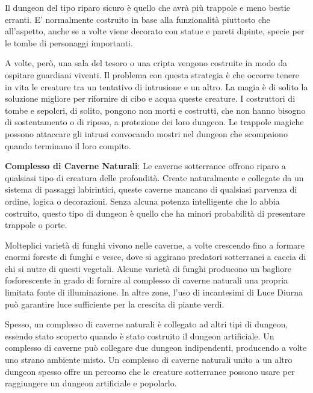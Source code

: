 \begin{multicols}{2}
Il dungeon del tipo riparo sicuro è quello che avrà più trappole e meno bestie erranti. E' normalmente costruito in base alla funzionalità piuttosto che all'aspetto, anche se a volte viene decorato con statue e pareti dipinte, specie per le tombe di personaggi importanti.


A volte, però, una sala del tesoro o una cripta vengono costruite in modo da ospitare guardiani viventi. Il problema con questa strategia è che occorre tenere in vita le creature tra un tentativo di intrusione e un altro. La magia è di solito la soluzione migliore per rifornire di cibo e acqua queste creature. I costruttori di tombe e sepolcri, di solito, pongono non morti e costrutti, che non hanno bisogno di sostentamento o di riposo, a protezione dei loro dungeon. Le trappole magiche possono attaccare gli intrusi convocando mostri nel dungeon che scompaiono quando terminano il loro compito.

\textbf{Complesso di Caverne Naturali}: Le caverne sotterranee offrono riparo a qualsiasi tipo di creatura delle profondità. Create naturalmente e collegate da un sistema di passaggi labirintici, queste caverne mancano di qualsiasi parvenza di ordine, logica o decorazioni. Senza alcuna potenza intelligente che lo abbia costruito, questo tipo di dungeon è quello che ha minori probabilità di presentare trappole o porte.

Molteplici varietà di funghi vivono nelle caverne, a volte crescendo fino a formare enormi foreste di funghi e vesce, dove si aggirano predatori sotterranei a caccia di chi si nutre di questi vegetali. Alcune varietà di funghi producono un bagliore fosforescente in grado di fornire al complesso di caverne naturali una propria limitata fonte di illuminazione. In altre zone, l'uso di incantesimi di Luce Diurna può garantire luce sufficiente per la crescita di piante verdi.

Spesso, un complesso di caverne naturali è collegato ad altri tipi di dungeon, essendo stato scoperto quando è stato costruito il dungeon artificiale. Un complesso di caverne può collegare due dungeon indipendenti, producendo a volte uno strano ambiente misto. Un complesso di caverne naturali unito a un altro dungeon spesso offre un percorso che le creature sotterranee possono usare per raggiungere un dungeon artificiale e popolarlo.


\end{multicols}

